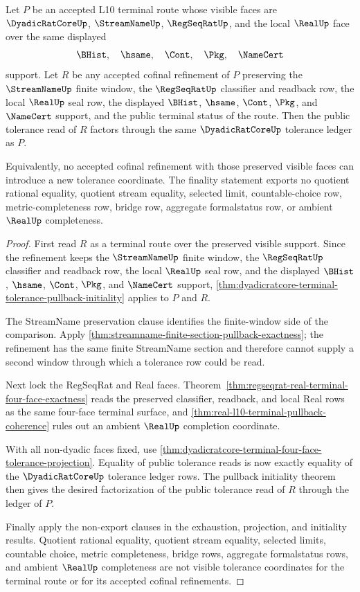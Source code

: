 \begin{theorem}
\label{thm:dyadicratcore-terminal-tolerance-cofinal-refinement-finality}
Let $P$ be an accepted L10 terminal route whose visible faces are $\DyadicRatCoreUp$, $\StreamNameUp$, $\RegSeqRatUp$, and the local $\RealUp$ face over the same displayed
$$
\BHist,\quad \hsame,\quad \Cont,\quad \Pkg,\quad \NameCert
$$
support. Let $R$ be any accepted cofinal refinement of $P$ preserving the $\StreamNameUp$ finite window, the $\RegSeqRatUp$ classifier and readback row, the local $\RealUp$ seal row, the displayed $\BHist$, $\hsame$, $\Cont$, $\Pkg$, and $\NameCert$ support, and the public terminal status of the route. Then the public tolerance read of $R$ factors through the same $\DyadicRatCoreUp$ tolerance ledger as $P$.

Equivalently, no accepted cofinal refinement with those preserved visible faces can introduce a new tolerance coordinate. The finality statement exports no quotient rational equality, quotient stream equality, selected limit, countable-choice row, metric-completeness row, bridge row, aggregate formalstatus row, or ambient $\RealUp$ completeness.
\end{theorem}
\begin{proof}
First read $R$ as a terminal route over the preserved visible support. Since the refinement keeps the $\StreamNameUp$ finite window, the $\RegSeqRatUp$ classifier and readback row, the local $\RealUp$ seal row, and the displayed $\BHist$, $\hsame$, $\Cont$, $\Pkg$, and $\NameCert$ support, \autoref{thm:dyadicratcore-terminal-tolerance-pullback-initiality} applies to $P$ and $R$.

The StreamName preservation clause identifies the finite-window side of the comparison. Apply \autoref{thm:streamname-finite-section-pullback-exactness}; the refinement has the same finite StreamName section and therefore cannot supply a second window through which a tolerance row could be read.

Next lock the RegSeqRat and Real faces. Theorem~\ref{thm:regseqrat-real-terminal-four-face-exactness} reads the preserved classifier, readback, and local Real rows as the same four-face terminal surface, and \autoref{thm:real-l10-terminal-pullback-coherence} rules out an ambient $\RealUp$ completion coordinate.

With all non-dyadic faces fixed, use \autoref{thm:dyadicratcore-terminal-four-face-tolerance-projection}. Equality of public tolerance reads is now exactly equality of the $\DyadicRatCoreUp$ tolerance ledger rows. The pullback initiality theorem then gives the desired factorization of the public tolerance read of $R$ through the ledger of $P$.

Finally apply the non-export clauses in the exhaustion, projection, and initiality results. Quotient rational equality, quotient stream equality, selected limits, countable choice, metric completeness, bridge rows, aggregate formalstatus rows, and ambient $\RealUp$ completeness are not visible tolerance coordinates for the terminal route or for its accepted cofinal refinements.
\end{proof}

